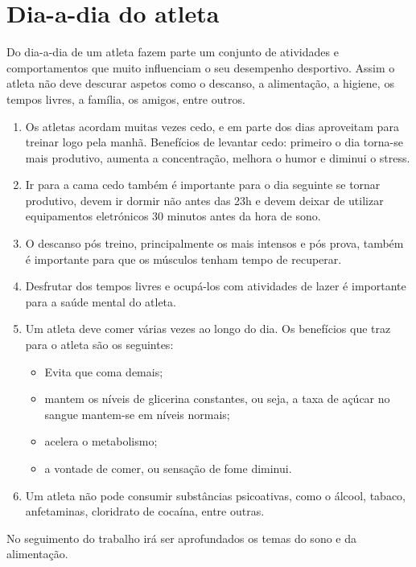 \documentclass{report}
\begin{document}
    \section{Dia-a-dia do atleta}
    Do dia-a-dia de um atleta fazem parte um conjunto de atividades e comportamentos que muito influenciam o seu desempenho desportivo. Assim o atleta não deve descurar aspetos como o descanso, a alimentação, a higiene, os tempos livres, a família, os amigos, entre outros.\par
    \renewcommand{\theenumi}{\roman{enumi}}
    \begin{enumerate}
        \item Os atletas acordam muitas vezes cedo, e em parte dos dias aproveitam para treinar logo pela manhã. Benefícios de levantar cedo: primeiro o dia torna-se mais produtivo, aumenta a concentração, melhora o humor e diminui o stress.
        \item Ir para a cama cedo também é importante para o dia seguinte se tornar produtivo, devem ir dormir não antes das 23h e devem deixar de utilizar equipamentos eletrónicos 30 minutos antes da hora de sono.
        \item O descanso pós treino, principalmente os mais intensos e pós prova, também é importante para que os músculos tenham tempo de recuperar.
        \item Desfrutar dos tempos livres e ocupá-los com atividades de lazer é importante para a saúde mental do atleta.
        \item Um atleta deve comer várias vezes ao longo do dia. Os benefícios que traz para o atleta são os seguintes: 
        \begin{itemize}
            \item Evita que coma demais;
            \item mantem os níveis de glicerina constantes, ou seja, a taxa de açúcar no sangue mantem-se em níveis normais;
            \item acelera o metabolismo;
            \item a vontade de comer, ou sensação de fome diminui.
        \end{itemize}
        \item Um atleta não pode consumir substâncias psicoativas, como o álcool, tabaco, anfetaminas, cloridrato de cocaína, entre outras.
    \end{enumerate}
    
    No seguimento do trabalho irá ser aprofundados os temas do sono e da alimentação.
\end{document}
